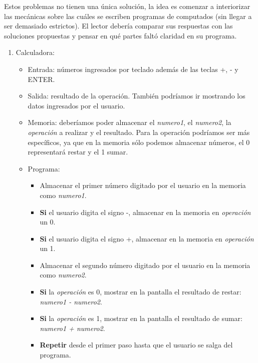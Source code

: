 \begin{Answer}	
	
Estos problemas no tienen una única solución, la idea es comenzar a interiorizar las mecánicas sobre las cuáles se escriben programas de computados (sin llegar a ser demasiado estrictos). El lector debería comparar sus respuestas con las soluciones propuestas y pensar en qué partes faltó claridad en su programa.
		
\begin{enumerate}
\item Calculadora:
	\begin{itemize}
		\item Entrada: números ingresados por teclado además de las teclas +, - y ENTER.
		\item Salida: resultado de la operación. También podríamos ir mostrando los datos ingresados por el usuario.
		\item Memoria: deberíamos poder almacenar el \emph{numero1}, el \emph{numero2}, la \emph{operación} a realizar y el resultado. Para la operación podríamos ser más específicos, ya que en la memoria sólo podemos almacenar números, el 0 representará restar y el 1 sumar.
		\item Programa:
		\begin{itemize}
			\item Almacenar el primer número digitado por el usuario en la memoria como  \emph{numero1}.					
			\item \textbf{Si} el usuario digita el signo -, almacenar en la memoria en \emph{operación} un 0.
			\item \textbf{Si} el usuario digita el signo +, almacenar en la memoria en \emph{operación} un 1.
			\item Almacenar el segundo número digitado por el usuario en la memoria como  \emph{numero2}.
			\item \textbf{Si} la \emph{operación} es 0, mostrar en la pantalla el resultado de restar: \emph{numero1 - numero2}.					
			\item \textbf{Si} la \emph{operación} es 1, mostrar en la pantalla el resultado de sumar: \emph{numero1 + numero2}.
			\item \textbf{Repetir} desde el primer paso hasta que el usuario se salga del programa.
		\end{itemize}
		
	\end{itemize}
	

\end{enumerate}
\end{Answer}
